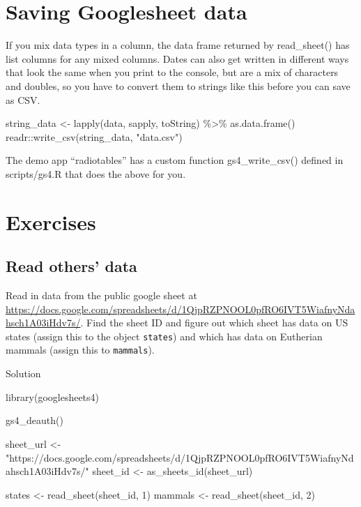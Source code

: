 \documentclass[
]{book}
\newenvironment{Shaded}{\begin{snugshade}}{\end{snugshade}}
\newcommand{\DecValTok}[1]{\textcolor[rgb]{0.00,0.00,0.81}{#1}}
\newcommand{\FunctionTok}[1]{\textcolor[rgb]{0.00,0.00,0.00}{#1}}
\newcommand{\NormalTok}[1]{#1}
\newcommand{\OtherTok}[1]{\textcolor[rgb]{0.56,0.35,0.01}{#1}}
\newcommand{\SpecialCharTok}[1]{\textcolor[rgb]{0.00,0.00,0.00}{#1}}
\newcommand{\StringTok}[1]{\textcolor[rgb]{0.31,0.60,0.02}{#1}}
\begin{document}
\hypertarget{gs4_save}{%
\section{Saving Googlesheet data}\label{gs4_save}}

If you mix data types in a column, the data frame returned by read\_sheet() has list columns for any mixed columns. Dates can also get written in different ways that look the same when you print to the console, but are a mix of characters and doubles, so you have to convert them to strings like this before you can save as CSV.

\begin{Shaded}
\begin{Highlighting}[]
\NormalTok{string\_data }\OtherTok{\textless{}{-}} \FunctionTok{lapply}\NormalTok{(data, sapply, toString) }\SpecialCharTok{\%\textgreater{}\%} \FunctionTok{as.data.frame}\NormalTok{()}
\NormalTok{readr}\SpecialCharTok{::}\FunctionTok{write\_csv}\NormalTok{(string\_data, }\StringTok{"data.csv"}\NormalTok{)}
\end{Highlighting}
\end{Shaded}

The demo app ``radiotables'' has a custom function gs4\_write\_csv() defined in scripts/gs4.R that does the above for you.

\hypertarget{exercises-data}{%
\section{Exercises}\label{exercises-data}}

\hypertarget{read-others-data}{%
\subsection{Read others' data}\label{read-others-data}}

Read in data from the public google sheet at \url{https://docs.google.com/spreadsheets/d/1QjpRZPNOOL0pfRO6IVT5WiafnyNdahsch1A03iHdv7s/}. Find the sheet ID and figure out which sheet has data on US states (assign this to the object \texttt{states}) and which has data on Eutherian mammals (assign this to \texttt{mammals}).

Solution

\begin{Shaded}
\begin{Highlighting}[]
\FunctionTok{library}\NormalTok{(googlesheets4)}

\FunctionTok{gs4\_deauth}\NormalTok{()}

\NormalTok{sheet\_url }\OtherTok{\textless{}{-}} \StringTok{"https://docs.google.com/spreadsheets/d/1QjpRZPNOOL0pfRO6IVT5WiafnyNdahsch1A03iHdv7s/"}
\NormalTok{sheet\_id }\OtherTok{\textless{}{-}} \FunctionTok{as\_sheets\_id}\NormalTok{(sheet\_url)}

\NormalTok{states }\OtherTok{\textless{}{-}} \FunctionTok{read\_sheet}\NormalTok{(sheet\_id, }\DecValTok{1}\NormalTok{)}
\NormalTok{mammals }\OtherTok{\textless{}{-}} \FunctionTok{read\_sheet}\NormalTok{(sheet\_id, }\DecValTok{2}\NormalTok{)}
\end{Highlighting}
\end{Shaded}
\end{document}
